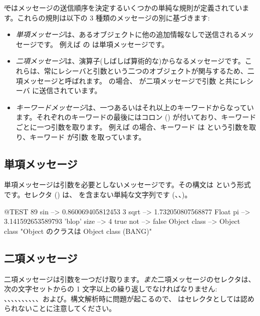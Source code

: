 \documentclass[a4paper,10pt,twoside]{book}
\begin{document}
\st ではメッセージの送信順序を決定するいくつかの単純な規則が定義されています。これらの規則は以下の 3 種類のメッセージの別に基づきます:
\begin{itemize}
\item \emph{単項メッセージ}は、あるオブジェクトに他の追加情報なしで送信されるメッセージです。 例えば  の  は単項メッセージです。
\item  \emph{二項メッセージ}は、演算子(しばしば算術的な)からなるメッセージです。これらは、常にレシーバと引数という二つのオブジェクトが関与するため、二項メッセージと呼ばれます。 の場合、\ct{+} が二項メッセージで引数  と共にレシーバ  に送信されています。
\item  \emph{キーワードメッセージ}は、一つあるいはそれ以上のキーワードからなっています。それぞれのキーワードの最後にはコロン (\ct{:}) が付いており、キーワードごとに一つ引数を取ります。
例えば  の場合、キーワード  は  という引数を取り、キーワード  が引数  を取っています。
\end{itemize}

\subsection{単項メッセージ}
単項メッセージは引数を必要としないメッセージです。その構文は  という形式です。セレクタ () は、\ct{:} を含まない単純な文字列です (\eg {}、、)。
\begin{code}{@TEST}
89 sin           --> 0.860069405812453
3 sqrt           --> 1.732050807568877
Float pi         --> 3.141592653589793
'blop' size     --> 4
true not        --> false
Object class --> Object class  "Object のクラスは Object class (BANG)"
\end{code}


\subsection{二項メッセージ} 
二項メッセージは引数を一つだけ取ります。\emph{また}二項メッセージのセレクタは、次の文字セットからの 1 文字以上の繰り返しでなければなりません: \ct{+}、\ct{-}、\ct{*}、\ct{/}、\ct{\&}、\ct{=}、\ct{>}、\ct{|}、\ct{<}、\ct{\~}、および。構文解析時に問題が起こるので、\ct{--} はセレクタとしては認められないことに注意してください。
\end{document}
